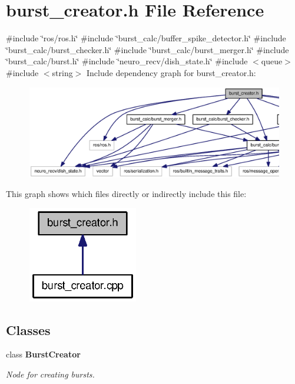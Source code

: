 \section{burst\-\_\-creator.\-h \-File \-Reference}
\label{burst__creator_8h}
{\ttfamily \#include \char`\"{}ros/ros.\-h\char`\"{}}\*
{\ttfamily \#include \char`\"{}burst\-\_\-calc/buffer\-\_\-spike\-\_\-detector.\-h\char`\"{}}\*
{\ttfamily \#include \char`\"{}burst\-\_\-calc/burst\-\_\-checker.\-h\char`\"{}}\*
{\ttfamily \#include \char`\"{}burst\-\_\-calc/burst\-\_\-merger.\-h\char`\"{}}\*
{\ttfamily \#include \char`\"{}burst\-\_\-calc/burst.\-h\char`\"{}}\*
{\ttfamily \#include \char`\"{}neuro\-\_\-recv/dish\-\_\-state.\-h\char`\"{}}\*
{\ttfamily \#include $<$queue$>$}\*
{\ttfamily \#include $<$string$>$}\*
\-Include dependency graph for burst\-\_\-creator.\-h\-:\nopagebreak
\begin{figure}[H]
\begin{center}
\leavevmode
\includegraphics[width=350pt]{burst__creator_8h__incl}
\end{center}
\end{figure}
\-This graph shows which files directly or indirectly include this file\-:\nopagebreak
\begin{figure}[H]
\begin{center}
\leavevmode
\includegraphics[width=136pt]{burst__creator_8h__dep__incl}
\end{center}
\end{figure}
\subsection*{\-Classes}
\begin{DoxyCompactItemize}
\item 
class {\bf \-Burst\-Creator}
\begin{DoxyCompactList}\small\item\em \-Node for creating bursts. \end{DoxyCompactList}\end{DoxyCompactItemize}
